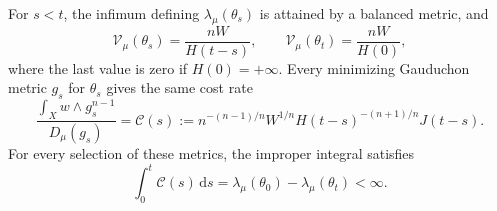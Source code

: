 \begin{theorem}\label{thm:warped-endpoint-subtraction}
For $s<t$, the infimum defining $\lambda_\mu(\theta_s)$ is attained by a balanced metric, and
\[
 \mathcal V_\mu(\theta_s)=\frac{nW}{H(t-s)},\qquad
 \mathcal V_\mu(\theta_t)=\frac{nW}{H(0)},
\]
where the last value is zero if $H(0)=+\infty$. Every minimizing Gauduchon metric $g_s$ for $\theta_s$ gives the same cost rate
\begin{equation}\label{eq:warped-subtraction-cost}
 \frac{\int_Xw\wedge g_s^{n-1}}{D_\mu(g_s)}
 =\mathcal C(s)
 :=n^{-(n-1)/n}W^{1/n}
        H(t-s)^{-(n+1)/n}J(t-s).
\end{equation}
For every selection of these metrics, the improper integral satisfies
\begin{equation}\label{eq:warped-improper-subtraction}
 \int_0^t\mathcal C(s)\,\mathrm{d}s
 =\lambda_\mu(\theta_0)-\lambda_\mu(\theta_t)<\infty.
\end{equation}
\end{theorem}
